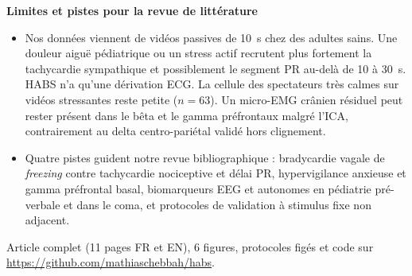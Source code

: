 \documentclass[10pt]{article}
\begin{document}
{\textbf{Limites et pistes pour la revue de littérature}
\begin{itemize}
\item Nos données viennent de vidéos passives de 10~s chez des adultes sains. Une douleur aiguë pédiatrique ou un stress actif recrutent plus fortement la tachycardie sympathique et possiblement le segment PR au-delà de 10 à 30~s. HABS n'a qu'une dérivation ECG. La cellule des spectateurs très calmes sur vidéos stressantes reste petite ($n = 63$). Un micro-EMG crânien résiduel peut rester présent dans le bêta et le gamma préfrontaux malgré l'ICA, contrairement au delta centro-pariétal validé hors clignement.
\item Quatre pistes guident notre revue bibliographique : bradycardie vagale de \emph{freezing} contre tachycardie nociceptive et délai PR, hypervigilance anxieuse et gamma préfrontal basal, biomarqueurs EEG et autonomes en pédiatrie pré-verbale et dans le coma, et protocoles de validation à stimulus fixe non adjacent.
\end{itemize}}

\smallskip
{\footnotesize Article complet (11 pages FR et EN), 6 figures, protocoles figés et code sur \url{https://github.com/mathiaschebbah/habs}.}
\end{document}
